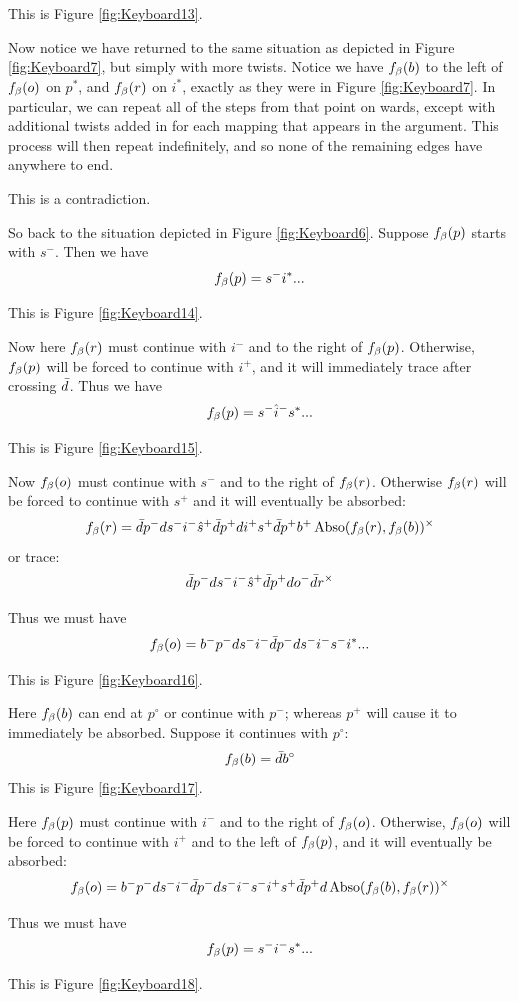 This is Figure \ref{fig:Keyboard13}.


Now notice we have returned to the same situation as depicted in Figure \ref{fig:Keyboard7}, but simply with more twists. Notice we have $f_\beta(b)$ to the left of $f_\beta(o)$ on $p^*$, and $f_\beta(r)$ on $i^*$, exactly as they were in Figure \ref{fig:Keyboard7}. In particular, we can repeat all of the steps from that point on wards, except with additional twists added in for each mapping that appears in the argument. This process will then repeat indefinitely, and so none of the remaining edges have anywhere to end.

This is a contradiction.

So back to the situation depicted in Figure \ref{fig:Keyboard6}. Suppose $f_\beta(p)$ starts with $s^-$. Then we have
\[
f_\beta(p) = s^- i^*...
\]

This is Figure \ref{fig:Keyboard14}.

Now here $f_\beta(r)$ must continue with $i^-$ and to the right of $f_\beta(p)$. Otherwise, $f_\beta(p)$ will be forced to continue with $i^+$, and it will immediately trace after crossing $\bar{d}$. Thus we have
\[
f_\beta(p) = s^- \hat{i}^- s^*...
\]

This is Figure \ref{fig:Keyboard15}.

Now $f_\beta(o)$ must continue with $s^-$ and to the right of $f_\beta(r)$. Otherwise $f_\beta(r)$ will be forced to continue with $s^+$ and it will eventually be absorbed:
\[
f_\beta(r) = \bar{d} p^- d s^- i^- \hat{s}^+ \bar{d} p^+ d i^+ s^+ \bar{d} p^+ b^+ \operatorname{Abso}(f_\beta(r), f_\beta(b))^\times
\]
or trace:
\[
\bar{d} p^- d s^- i^- \hat{s}^+ \bar{d} p^+ d o^- \bar{d} r^\times
\]

Thus we must have
\[
f_\beta(o) = b^- p^- d s^- i^- \bar{d} p^- d s^- i^- s^- i^*...
\]

This is Figure \ref{fig:Keyboard16}.

Here $f_\beta(b)$ can end at $p^\circ$ or continue with $p^-$; whereas $p^+$ will cause it to immediately be absorbed. Suppose it continues with $p^\circ$:
\[
f_\beta(b) = \bar{d} b^\circ
\]
This is Figure \ref{fig:Keyboard17}.

Here $f_\beta(p)$ must continue with $i^-$ and to the right of $f_\beta(o)$. Otherwise, $f_\beta(o)$ will be forced to continue with $i^+$ and to the left of $f_\beta(p)$, and it will eventually be absorbed:
\[
f_\beta(o) = b^- p^- d s^- i^- \bar{d} p^- d s^- i^- s^- i^+ s^+ \bar{d} p^+ d \operatorname{Abso}(f_\beta(b), f_\beta(r))^\times
\]

Thus we must have
\[
f_\beta(p) = s^- i^- s^*...
\]

This is Figure \ref{fig:Keyboard18}.

